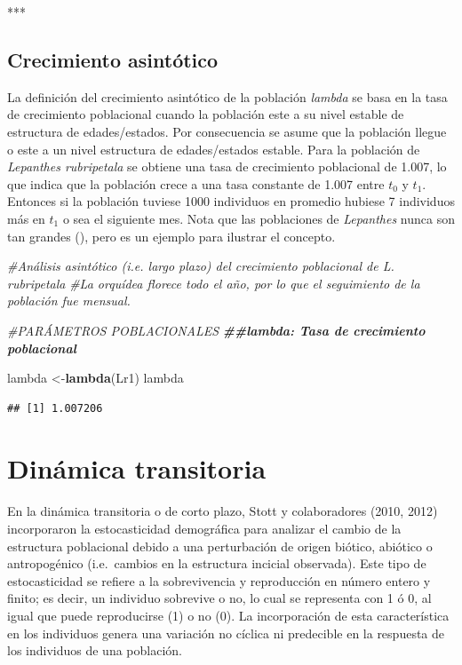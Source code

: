 \documentclass[
]{book}
\newenvironment{Shaded}{\begin{snugshade}}{\end{snugshade}}
\newcommand{\CommentTok}[1]{\textcolor[rgb]{0.56,0.35,0.01}{\textit{#1}}}
\newcommand{\DocumentationTok}[1]{\textcolor[rgb]{0.56,0.35,0.01}{\textbf{\textit{#1}}}}
\newcommand{\FunctionTok}[1]{\textcolor[rgb]{0.13,0.29,0.53}{\textbf{#1}}}
\newcommand{\NormalTok}[1]{#1}
\newcommand{\OtherTok}[1]{\textcolor[rgb]{0.56,0.35,0.01}{#1}}
\theoremstyle{definition}
\theoremstyle{definition}
\theoremstyle{definition}
\theoremstyle{definition}
\theoremstyle{remark}
\begin{document}
***

\subsection{Crecimiento asintótico}\label{crecimiento-asintuxf3tico}

La definición del crecimiento asintótico de la población \emph{lambda} se basa en la tasa de crecimiento poblacional cuando la población este a su nivel estable de estructura de edades/estados. Por consecuencia se asume que la población llegue o este a un nivel estructura de edades/estados estable. Para la población de \emph{Lepanthes rubripetala} se obtiene una tasa de crecimiento poblacional de 1.007, lo que indica que la población crece a una tasa constante de 1.007 entre \(t_{0}\) y \(t_{1}\). Entonces si la población tuviese 1000 individuos en promedio hubiese 7 individuos más en \(t_{1}\) o sea el siguiente mes. Nota que las poblaciones de \emph{Lepanthes} nunca son tan grandes (\citet{tremblay1997distribution}), pero es un ejemplo para ilustrar el concepto.

\begin{Shaded}
\begin{Highlighting}[]
\CommentTok{\#Análisis asintótico (i.e. largo plazo) del crecimiento poblacional de L. rubripetala}
\CommentTok{\#La orquídea florece todo el año, por lo que el seguimiento de la población fue mensual. }

\CommentTok{\#PARÁMETROS POBLACIONALES}
\DocumentationTok{\#\#lambda: Tasa de crecimiento poblacional}


\NormalTok{lambda }\OtherTok{\textless{}{-}}\FunctionTok{lambda}\NormalTok{(Lr1)}
\NormalTok{lambda}
\end{Highlighting}
\end{Shaded}

\begin{verbatim}
## [1] 1.007206
\end{verbatim}

\section{Dinámica transitoria}\label{dinuxe1mica-transitoria}

En la dinámica transitoria o de corto plazo, Stott y colaboradores (2010, 2012) incorporaron la estocasticidad demográfica para analizar el cambio de la estructura poblacional debido a una perturbación de origen biótico, abiótico o antropogénico (i.e.~cambios en la estructura incicial observada). Este tipo de estocasticidad se refiere a la sobrevivencia y reproducción en número entero y finito; es decir, un individuo sobrevive o no, lo cual se representa con 1 ó 0, al igual que puede reproducirse (1) o no (0). La incorporación de esta característica en los individuos genera una variación no cíclica ni predecible en la respuesta de los individuos de una población.
\end{document}

